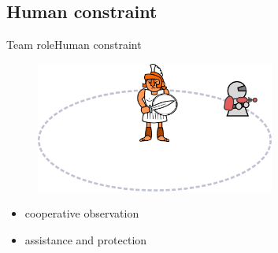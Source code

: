 \subsection{Human constraint}

\begin{frame}{Team role}{Human constraint}

\begin{figure}
\centering
\includegraphics[width = 0.7\textwidth]{./figure/human_robot_interaction}
\end{figure}

\begin{itemize}
\item cooperative observation
\item assistance and protection
\end{itemize}

\end{frame}

